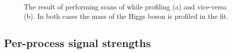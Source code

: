 \begin{figure}[ht!]
\centering
{} \\
\caption{The result of performing \DNLL scans of \muF while profiling \muV (a) and vice-versa (b). In both cases the mass of the Higgs boson is profiled in the fit. }

\label{fig:statandresults:mu_per_rv_and_rf}

\end{figure}

\subsection{Per-process signal strengths}
\label{sec:statandresults:mu_per_proc}

